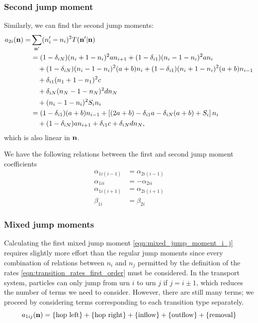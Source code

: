\subsubsection{Second jump moment}
Similarly, we can find the second jump moments:
\begin{equation}
    \begin{aligned}
        a_{2i}(\mathbf{n}) =& \sum_{\mathbf{n}'} (n_i' - n_i)^2 T(\mathbf{n}' | \mathbf{n})\\
        &= (1-\delta_{iN})(n_i + 1 - n_i)^2a n_{i+1}
        +  (1-\delta_{i1})(n_i - 1 - n_i)^2a n_i\\
        &\quad+ (1-\delta_{iN})(n_i - 1 - n_i)^2(a+b) n_i
        +  (1-\delta_{i1})(n_i + 1 - n_i)^2(a+b) n_{i-1}\\
        &\quad+ \delta_{i1}(n_1 + 1 - n_1)^2 c\\
        &\quad+ \delta_{iN}(n_N - 1 - n_N)^2 d n_N\\
        &\quad+ (n_i - 1 - n_i)^2 S_i n_i\\
        &= (1-\delta_{i1})(a+b)n_{i-1} + \left[(2a+b) - \delta_{i1}a -
        \delta_{iN}(a+b) + S_i\right]n_i\\
        &\quad+ (1-\delta_{iN})an_{i+1} + \delta_{i1}c + \delta_{iN}d n_N,
    \end{aligned}
    \label{eqn:second_jump_mom_first_order}
\end{equation}
which is also linear in \(\mathbf{n}\).

We have the following relations between the first and second jump moment
coefficients
\begin{align*}
    \alpha_{1i(i-1)} &= \alpha_{2i(i-1)}\\
    \alpha_{1ii} &= -\alpha_{2ii}\\
    \alpha_{1i(i+1)} &= \alpha_{2i(i+1)}\\
    \beta_{1i} &= \beta_{2i}
\end{align*}

\subsubsection{Mixed jump moments}
Calculating the first mixed jump moment \eqref{eqn:mixed_jump_moment_i_j}
requires slightly more effort than the regular jump moments since every
combination of relations between \(n_i\) and \(n_j\) permitted by the definition
of the rates \eqref{eqn:transition_rates_first_order} must be considered. In the
transport system, particles can only jump from urn \(i\) to urn \(j\) if \(j = i
\pm 1\), which reduces the number of terms we need to consider. However, there
are still many terms; we proceed by considering terms corresponding to each
transition type separately.
\begin{equation}
    a_{1ij}(\mathbf{n}) = \{\text{hop left}\} + \{\text{hop right}\} +
    \{\text{inflow}\} + \{\text{outflow}\} + \{\text{removal}\}
\end{equation}

